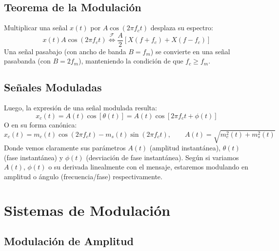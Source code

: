 \documentclass[11pt,a4paper]{article}
\numberwithin{equation}{section}
\begin{document}
\subsection{Teorema de la Modulación}
Multiplicar una señal $x(t)$ por $A\cos(2\pi f_ct)$ desplaza su espectro:
\begin{equation}
  x(t)A\cos(2\pi f_ct) \overset{\mathcal{F}}{\Longleftrightarrow} \frac{A}{2} [X(f + f_c) + X(f - f_c)]
\end{equation}
Una señal pasabajo (con ancho de banda $B=f_m$) se convierte en una señal pasabanda (con $B=2f_m$), manteniendo la condición de que $f_c \geq f_m$.

\subsection{Señales Moduladas}
Luego, la expresión de una señal modulada resulta:
\begin{equation}
  x_c(t)=A(t)\cos[\theta (t)]=A(t)\cos[2\pi f_ct + \phi (t)]
\end{equation}
O en su forma canónica:
\begin{equation}
  x_c(t)=m_c(t)\cos(2\pi f_ct)-m_s(t)\sin(2\pi f_ct),\qquad A(t)=\sqrt{m_c^2(t)+m_s^2(t)}
\end{equation}
Donde vemos claramente sus parámetros $A(t)$ (amplitud instantánea), $\theta (t)$ (fase instantánea) y $\phi (t)$ (desviación de fase instantánea). Según si variamos $A(t)$, $\phi (t)$ o su derivada linealmente con el mensaje, estaremos modulando en amplitud o ángulo (frecuencia/fase) respectivamente.

\section{Sistemas de Modulación}

\subsection{Modulación de Amplitud}
\end{document}
